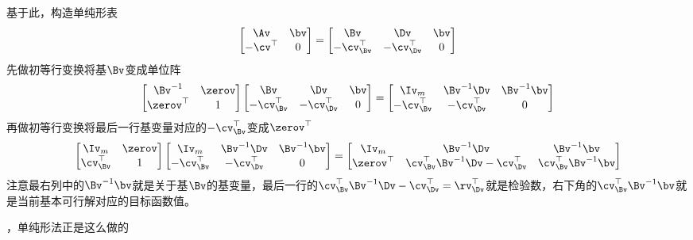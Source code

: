 \documentclass{ctexart}
\begin{document}
基于此，构造单纯形表
\begin{align*}
    \begin{bmatrix}
        \Av & \bv \\ -\cv^\top & 0
    \end{bmatrix} =
    \begin{bmatrix}
        \Bv & \Dv & \bv \\ -\cv_\Bv^\top & -\cv_\Dv^\top & 0
    \end{bmatrix}
\end{align*}
先做初等行变换将基$\Bv$变成单位阵
\begin{align*}
    \begin{bmatrix}
        \Bv^{-1} & \zerov \\ \zerov^\top & 1
    \end{bmatrix}
    \begin{bmatrix}
        \Bv & \Dv & \bv \\ -\cv_\Bv^\top & -\cv_\Dv^\top & 0
    \end{bmatrix} =
    \begin{bmatrix}
        \Iv_m & \Bv^{-1} \Dv & \Bv^{-1} \bv \\ -\cv_\Bv^\top & -\cv_\Dv^\top & 0
    \end{bmatrix}
\end{align*}
再做初等行变换将最后一行基变量对应的$-\cv_\Bv^\top$变成$\zerov^\top$
\begin{align*}
    \begin{bmatrix}
        \Iv_m & \zerov \\ \cv_\Bv^\top & 1
    \end{bmatrix}
    \begin{bmatrix}
        \Iv_m & \Bv^{-1} \Dv & \Bv^{-1} \bv \\ -\cv_\Bv^\top & -\cv_\Dv^\top & 0
    \end{bmatrix} =
    \begin{bmatrix}
        \Iv_m & \Bv^{-1} \Dv & \Bv^{-1} \bv \\ \zerov^\top & \cv_\Bv^\top \Bv^{-1} \Dv - \cv_\Dv^\top & \cv_\Bv^\top \Bv^{-1} \bv
    \end{bmatrix}
\end{align*}
注意最右列中的$\Bv^{-1} \bv$就是关于基$\Bv$的基变量，最后一行的$\cv_\Bv^\top \Bv^{-1} \Dv - \cv_\Dv^\top = \rv_\Dv^\top$就是检验数，右下角的$\cv_\Bv^\top \Bv^{-1} \bv$就是当前基本可行解对应的目标函数值。






























，单纯形法正是这么做的
\end{document}

